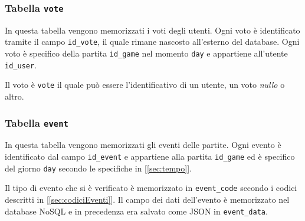 \subsubsection{Tabella \texttt{vote}}

In questa tabella vengono memorizzati i voti degli utenti. Ogni voto è identificato tramite il campo \texttt{id\_vote}, il quale rimane nascosto all'esterno del database. Ogni voto è specifico della partita \texttt{id\_game} nel momento \texttt{day} e appartiene all'utente \texttt{id\_user}. 

Il voto è \texttt{vote} il quale può essere l'identificativo di un utente, un voto \emph{nullo} o altro. 



\subsubsection{Tabella \texttt{event}}

In questa tabella vengono memorizzati gli eventi delle partite. Ogni evento è identificato dal campo \texttt{id\_event} e appartiene alla partita \texttt{id\_game} ed è specifico del giorno \texttt{day} secondo le specifiche in [\ref{sec:tempo}].

Il tipo di evento che si è verificato è memorizzato in \texttt{event\_code} secondo i codici descritti in [\ref{sec:codiciEventi}]. Il campo dei dati dell'evento è memorizzato nel database NoSQL e in precedenza era salvato come JSON in \texttt{event\_data}.




